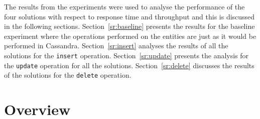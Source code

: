  The results from the experiments were used to
analyse the performance of the four solutions with respect to  response
time and throughput and this is discussed in the following sections.
Section~\ref{sr:baseline} presents the results for the baseline experiment where 
the operations performed on the entities are just as it would be performed in
Cassandra. Section~\ref{sr:insert} analyses the results of all the solutions
for the \texttt{insert} operation. Section~\ref{sr:update} presents the analysis
for the \texttt{update} operation for all the solutions. Section~\ref{sr:delete}
discusses the results of the solutions for the \texttt{delete} operation. 






\newcommand{\Width}{0.5\textwidth}
\newcommand{\TB}[1]{\textbf{#1}}

\section{Overview}






